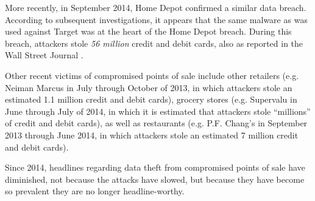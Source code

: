 More recently, in September 2014, Home Depot confirmed a similar data breach.
According to subsequent investigations, it appears that the same malware as was used against Target was at the heart of the Home Depot breach.
During this breach, attackers stole \emph{56 million} credit and debit cards, also as reported in the Wall Street Journal \cite{homedepothack}.

Other recent victims of compromised points of sale include other retailers
	(e.g. Neiman Marcus in July through October of 2013, in which attackers stole an estimated 1.1 million credit and debit cards)\cite{neimanmarcushack},
	grocery stores (e.g. Supervalu in June through July of 2014, in which it is estimated that attackers stole ``millions'' of credit and debit cards\cite{supervaluhack}),
	as well as restaurants (e.g. P.F. Chang's in September 2013 through June 2014, in which attackers stole an estimated 7 million credit and debit cards\cite{pfchanghack}).

Since 2014, headlines regarding data theft from compromised points of sale have diminished,
    not because the attacks have slowed, but because they have become so prevalent they are no longer headline-worthy.
